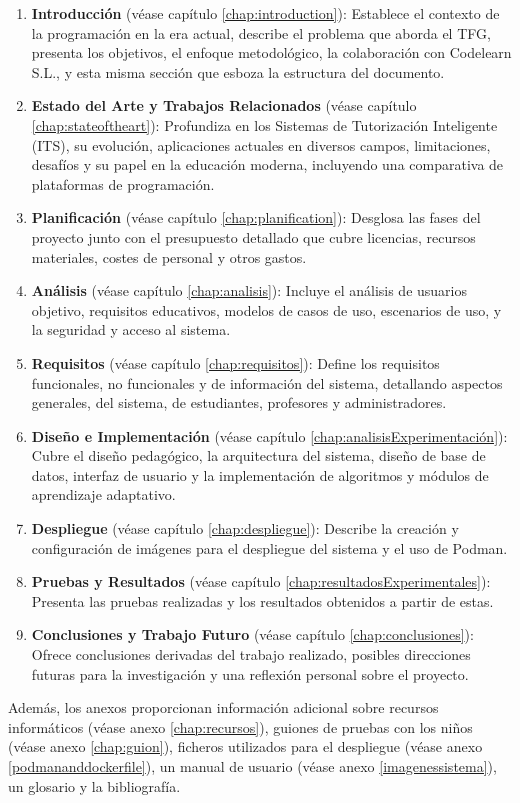 \begin{enumerate}
    \item  \textbf{Introducción} (véase capítulo \ref{chap:introduction}): Establece el contexto de la programación en la era actual, describe el problema que aborda el TFG, presenta los objetivos, el enfoque metodológico, la colaboración con Codelearn S.L., y esta misma sección que esboza la estructura del documento.
    \item  \textbf{Estado del Arte y Trabajos Relacionados} (véase capítulo \ref{chap:stateoftheart}): Profundiza en los Sistemas de Tutorización Inteligente (ITS), su evolución, aplicaciones actuales en diversos campos, limitaciones, desafíos y su papel en la educación moderna, incluyendo una comparativa de plataformas de programación.
    \item \textbf{Planificación} (véase capítulo \ref{chap:planification}): Desglosa las fases del proyecto junto con el presupuesto detallado que cubre licencias, recursos materiales, costes de personal y otros gastos.
    \item \textbf{Análisis} (véase capítulo \ref{chap:analisis}): Incluye el análisis de usuarios objetivo, requisitos educativos, modelos de casos de uso, escenarios de uso, y la seguridad y acceso al sistema.
    \item \textbf{Requisitos} (véase capítulo \ref{chap:requisitos}): Define los requisitos funcionales, no funcionales y de información del sistema, detallando aspectos generales, del sistema, de estudiantes, profesores y administradores.
    \item \textbf{Diseño e Implementación} (véase capítulo \ref{chap:analisisExperimentación}): Cubre el diseño pedagógico, la arquitectura del sistema, diseño de base de datos, interfaz de usuario y la implementación de algoritmos y módulos de aprendizaje adaptativo.
    \item  \textbf{Despliegue} (véase capítulo \ref{chap:despliegue}): Describe la creación y configuración de imágenes para el despliegue del sistema y el uso de Podman.
    \item \textbf{Pruebas y Resultados} (véase capítulo \ref{chap:resultadosExperimentales}): Presenta las pruebas realizadas y los resultados obtenidos a partir de estas.
    \item \textbf{Conclusiones y Trabajo Futuro} (véase capítulo \ref{chap:conclusiones}): Ofrece conclusiones derivadas del trabajo realizado, posibles direcciones futuras para la investigación y una reflexión personal sobre el proyecto.
\end{enumerate}    

Además, los anexos proporcionan información adicional sobre recursos informáticos (véase anexo \ref{chap:recursos}), guiones de pruebas con los niños (véase anexo \ref{chap:guion}), ficheros utilizados para el despliegue (véase anexo \ref{podmananddockerfile}), un manual de usuario (véase anexo \ref{imagenessistema}), un glosario y la bibliografía.